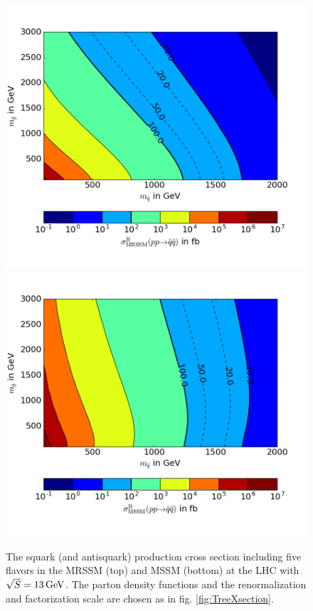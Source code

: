 \begin{figure}[!htpb]
\begin{center}
\includegraphics[scale=.55]{figures/contour_MRSSM_squarks}
\includegraphics[scale=.55]{figures/contour_MSSM_squarks}
\caption{The squark (and antisquark) production cross section including five flavors in the MRSSM (top) and MSSM (bottom) at the LHC with $\sqrt{S} = \unit[13]{GeV}$. The parton density functions and the renormalization and factorization scale are chosen as in fig. \ref{fig:TreeXsection}.}\label{fig:ContourTree}
\end{center}
\end{figure}

